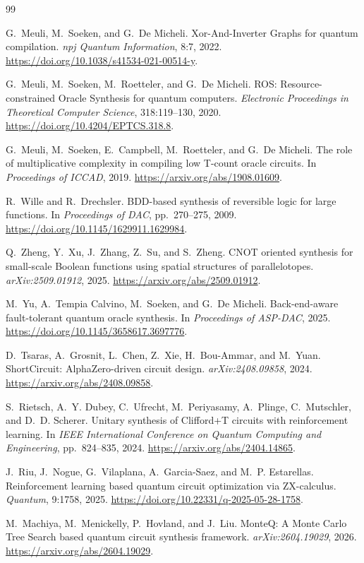 \documentclass[UTF8,fontset=macnew,11pt]{ctexart}
\begin{document}
\begin{thebibliography}{99}

G.~Meuli, M.~Soeken, and G.~De Micheli.
\newblock Xor-And-Inverter Graphs for quantum compilation.
\newblock \emph{npj Quantum Information}, 8:7, 2022.
\newblock \url{https://doi.org/10.1038/s41534-021-00514-y}.

G.~Meuli, M.~Soeken, M.~Roetteler, and G.~De Micheli.
\newblock ROS: Resource-constrained Oracle Synthesis for quantum computers.
\newblock \emph{Electronic Proceedings in Theoretical Computer Science}, 318:119--130, 2020.
\newblock \url{https://doi.org/10.4204/EPTCS.318.8}.

G.~Meuli, M.~Soeken, E.~Campbell, M.~Roetteler, and G.~De Micheli.
\newblock The role of multiplicative complexity in compiling low T-count oracle circuits.
\newblock In \emph{Proceedings of ICCAD}, 2019.
\newblock \url{https://arxiv.org/abs/1908.01609}.

R.~Wille and R.~Drechsler.
\newblock BDD-based synthesis of reversible logic for large functions.
\newblock In \emph{Proceedings of DAC}, pp.~270--275, 2009.
\newblock \url{https://doi.org/10.1145/1629911.1629984}.

Q.~Zheng, Y.~Xu, J.~Zhang, Z.~Su, and S.~Zheng.
\newblock CNOT oriented synthesis for small-scale Boolean functions using spatial structures of parallelotopes.
\newblock \emph{arXiv:2509.01912}, 2025.
\newblock \url{https://arxiv.org/abs/2509.01912}.

M.~Yu, A.~Tempia Calvino, M.~Soeken, and G.~De Micheli.
\newblock Back-end-aware fault-tolerant quantum oracle synthesis.
\newblock In \emph{Proceedings of ASP-DAC}, 2025.
\newblock \url{https://doi.org/10.1145/3658617.3697776}.

D.~Tsaras, A.~Grosnit, L.~Chen, Z.~Xie, H.~Bou-Ammar, and M.~Yuan.
\newblock ShortCircuit: AlphaZero-driven circuit design.
\newblock \emph{arXiv:2408.09858}, 2024.
\newblock \url{https://arxiv.org/abs/2408.09858}.

S.~Rietsch, A.~Y. Dubey, C.~Ufrecht, M.~Periyasamy, A.~Plinge, C.~Mutschler, and D.~D. Scherer.
\newblock Unitary synthesis of Clifford+T circuits with reinforcement learning.
\newblock In \emph{IEEE International Conference on Quantum Computing and Engineering}, pp.~824--835, 2024.
\newblock \url{https://arxiv.org/abs/2404.14865}.

J.~Riu, J.~Nogue, G.~Vilaplana, A.~Garcia-Saez, and M.~P. Estarellas.
\newblock Reinforcement learning based quantum circuit optimization via ZX-calculus.
\newblock \emph{Quantum}, 9:1758, 2025.
\newblock \url{https://doi.org/10.22331/q-2025-05-28-1758}.

M.~Machiya, M.~Menickelly, P.~Hovland, and J.~Liu.
\newblock MonteQ: A Monte Carlo Tree Search based quantum circuit synthesis framework.
\newblock \emph{arXiv:2604.19029}, 2026.
\newblock \url{https://arxiv.org/abs/2604.19029}.

\end{thebibliography}
\end{document}
